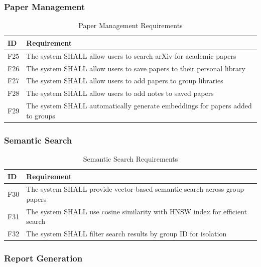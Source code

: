 \documentclass[11pt,a4paper]{article}
\begin{document}
\subsubsection{Paper Management}

\begin{table}[H]
\centering
\begin{tabular}{p{1.5cm}p{11.5cm}}
\toprule
\textbf{ID} & \textbf{Requirement} \\
\midrule
F25 & The system SHALL allow users to search arXiv for academic papers \\
F26 & The system SHALL allow users to save papers to their personal library \\
F27 & The system SHALL allow users to add papers to group libraries \\
F28 & The system SHALL allow users to add notes to saved papers \\
F29 & The system SHALL automatically generate embeddings for papers added to groups \\
\bottomrule
\end{tabular}
\caption{Paper Management Requirements}
\end{table}

\subsubsection{Semantic Search}

\begin{table}[H]
\centering
\begin{tabular}{p{1.5cm}p{11.5cm}}
\toprule
\textbf{ID} & \textbf{Requirement} \\
\midrule
F30 & The system SHALL provide vector-based semantic search across group papers \\
F31 & The system SHALL use cosine similarity with HNSW index for efficient search \\
F32 & The system SHALL filter search results by group ID for isolation \\
\bottomrule
\end{tabular}
\caption{Semantic Search Requirements}
\end{table}

\subsubsection{Report Generation}
\end{document}
